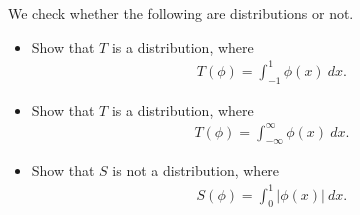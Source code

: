 \documentclass[11pt]{article}
\begin{document}
\begin{exercise}
	We check whether the following are distributions or not.
    \begin{itemize}    
        \item 
        Show that $T$ is a distribution, where 
        \begin{align}\label{eq:ex2 dist1}
            T(\phi) = \int_{-1}^{1} \phi(x) \ dx
			.
        \end{align}
        \item 
        Show that $T$ is a distribution, where 
        \begin{align}\label{eq:ex2 dist2}
            T(\phi) = \int_{-\infty}^{\infty} \phi(x) \ dx
			.
        \end{align}
        \item 
        Show that $S$ is not a distribution, where 
        \begin{align}\label{eq:ex2 dist3}
            S(\phi) = \int_{0}^{1} |\phi(x)| \ dx 
			.
        \end{align}
    \end{itemize}
\end{exercise}
\end{document}
